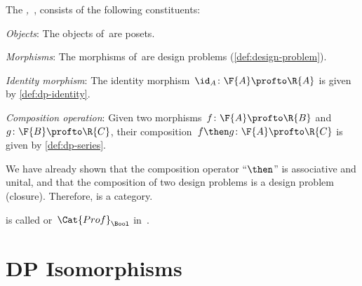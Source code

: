 \begin{definition}\label{def:DP}
    The \emph{,~\DP}, consists of the following constituents:
    \begin{compactenum}
        \item \emph{Objects}: The objects of~\DP are posets.
        \item \emph{Morphisms}: The morphisms of~\DP are design problems (\cref{def:design-problem}).
        \item \emph{Identity morphism}: The identity morphism~$\id_A \colon \F{A} \profto \R{A}$ is given by \cref{def:dp-identity}.
        \item \emph{Composition operation}: Given two morphisms~$f \colon  \F{A} \profto \R{B}$ and~$g \colon \F{B} \profto \R{C}$, their
        composition~$f\then g\colon  \F{A} \profto \R{C}$ is
        given by \cref{def:dp-series}.
    \end{compactenum}
\end{definition}

We have already shown that the composition operator ``$\then$'' is associative and unital, and that the composition of two design problems is a design problem (closure). Therefore, \DP is a category.

\begin{remark}
    \DP is called \feas or~$\Cat{Prof}_\Bool$ in~\cite{fong2019}.
\end{remark}


\section{DP Isomorphisms}

